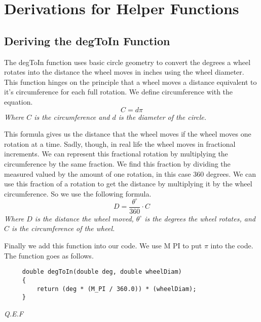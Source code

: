 \documentclass[12pt]{article}
\begin{document}
\section{Derivations for Helper Functions}
\subsection{Deriving the degToIn Function} \label{app_degToIn}
    The degToIn function uses basic circle geometry to convert the degrees a wheel rotates into the distance the wheel moves in inches using the wheel diameter. This function hinges on the principle that a wheel moves a distance equivalent to it's circumference for each full rotation. We define circumference with the equation.
    $$ C = d\pi $$
    \center\textit{Where $C$ is the circumference and $d$ is the diameter of the circle.}

    \raggedright
    This formula gives us the distance that the wheel moves if the wheel moves one rotation at a time. Sadly, though, in real life the wheel moves in fractional increments. We can represent this fractional rotation by multiplying the circumference by the same fraction. We find this fraction by dividing the measured valued by the amount of one rotation, in this case 360 degrees. We can use this fraction of a rotation to get the distance by multiplying it by the wheel circumference. So we use the following formula.
    $$ D = \frac{\theta^\circ}{360} \cdot C $$
    \center\textit{Where $D$ is the distance the wheel moved, $\theta^\circ$ is the degrees the wheel rotates, and $C$ is the circumference of the wheel.}

    \raggedright
    Finally we add this function into our code. We use M PI to put $\pi$ into the code. The function goes as follows.

    \begin{verbatim}
     double degToIn(double deg, double wheelDiam)
     {
         return (deg * (M_PI / 360.0)) * (wheelDiam);
     }
    \end{verbatim}

    \textit{Q.E.F}

    \pagebreak
\end{document}

